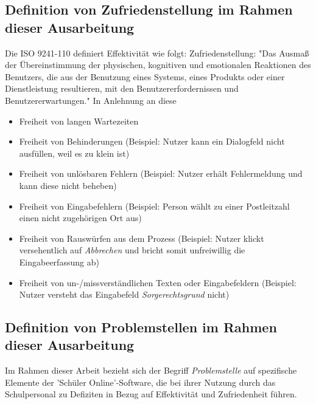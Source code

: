 \subsection{Definition von Zufriedenstellung im Rahmen dieser Ausarbeitung }
Die ISO 9241-110 definiert Effektivität wie folgt: Zufriedenstellung: "Das Ausmaß der Übereinstimmung der physischen, kognitiven und emotionalen Reaktionen des Benutzers, die aus der Benutzung eines Systems, eines Produkts oder einer Dienstleistung resultieren, mit den Benutzererfordernissen und Benutzererwartungen."\cite{ISO-9241-110} In Anlehnung an diese
\begin{itemize}
    \item Freiheit von langen Wartezeiten
    \item Freiheit von Behinderungen (Beispiel: Nutzer kann ein Dialogfeld nicht ausfüllen, weil es zu klein ist)
    \item Freiheit von unlösbaren Fehlern (Beispiel: Nutzer erhält Fehlermeldung und kann diese nicht beheben)
    \item Freiheit von Eingabefehlern (Beispiel: Person wählt zu einer Postleitzahl einen nicht zugehörigen Ort aus)
    \item Freiheit von Rauswürfen aus dem Prozess (Beispiel: Nutzer klickt versehentlich auf \textit{Abbrechen} und bricht somit unfreiwillig die Eingabeerfassung ab)
    \item Freiheit von un-/missverständlichen Texten oder Eingabefeldern (Beispiel: Nutzer versteht das Eingabefeld \textit{Sorgerechtsgrund} nicht)
\end{itemize}

\subsection{Definition von Problemstellen im Rahmen dieser Ausarbeitung }
Im Rahmen dieser Arbeit bezieht sich der Begriff \textit{Problemstelle} auf spezifische Elemente der 'Schüler Online'-Software, die bei ihrer Nutzung durch das Schulpersonal zu Defiziten in Bezug auf Effektivität und Zufriedenheit führen.


